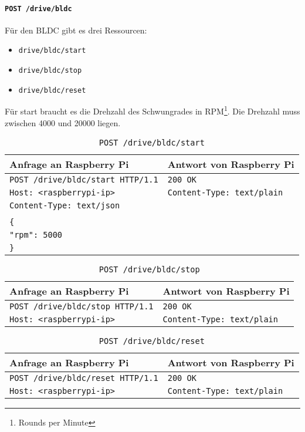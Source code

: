 \paragraph{\texttt{POST /drive/bldc}}

Für den BLDC gibt es drei Ressourcen:
\begin{itemize}
	\item \texttt{drive/bldc/start}
	\item \texttt{drive/bldc/stop}
	\item \texttt{drive/bldc/reset}
\end{itemize}
Für start braucht es die Drehzahl des Schwungrades in RPM\footnote{Rounds per Minute}. Die Drehzahl muss zwischen 4000 und 20000 liegen.

\begin{table}[h!]
	\centering
	\begin{tabular}{|l|l|}
		\hline Anfrage an Raspberry Pi & Antwort von Raspberry Pi \\ 
		\hline \texttt{POST /drive/bldc/start HTTP/1.1} & \texttt{200 OK} \\
		\texttt{Host: <raspberrypi-ip>} & \texttt{Content-Type: text/plain} \\
		\texttt{Content-Type: text/json} & \\
		& \\
		\verb|{| & \\
		\verb|"rpm": 5000| & \\
		\verb|}|& \\
		\hline 
	\end{tabular} 
	\caption{\texttt{POST /drive/bldc/start}}
	\label{tab:post-drive-bldc-start}
\end{table}

\begin{table}[h!]
	\centering
	\begin{tabular}{|l|l|}
		\hline Anfrage an Raspberry Pi & Antwort von Raspberry Pi \\ 
		\hline \texttt{POST /drive/bldc/stop HTTP/1.1} & \texttt{200 OK} \\
		\texttt{Host: <raspberrypi-ip>} & \texttt{Content-Type: text/plain} \\
		\hline 
	\end{tabular} 
	\caption{\texttt{POST /drive/bldc/stop}}
	\label{tab:post-drive-bldc-stop}
\end{table}

\begin{table}[h!]
	\centering
	\begin{tabular}{|l|l|}
		\hline Anfrage an Raspberry Pi & Antwort von Raspberry Pi \\ 
		\hline \texttt{POST /drive/bldc/reset HTTP/1.1} & \texttt{200 OK} \\
		\texttt{Host: <raspberrypi-ip>} & \texttt{Content-Type: text/plain} \\
		\hline 
	\end{tabular} 
	\caption{\texttt{POST /drive/bldc/reset}}
	\label{tab:post-drive-bldc-reset}
\end{table}

